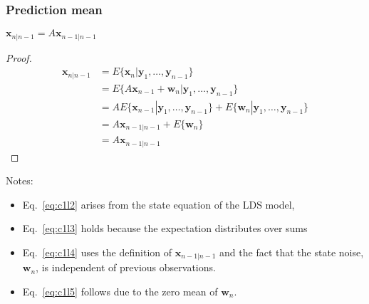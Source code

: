 \begin{frame}
    \frametitle{Prediction mean}

    \scriptsize
\begin{claim}
    $\mathbf{x}_{n|n-1}=A\mathbf{x}_{n-1|n-1}$
    \label{claim:predictionMean}
\end{claim}

\begin{proof}
    \begin{align}
        \mathbf{x}_{n|n-1}&=E\{\mathbf{x}_n|\mathbf{y}_1,\ldots,\mathbf{y}_{n-1}\}\nonumber\\
                          &=E\{A\mathbf{x}_{n-1}+\mathbf{w}_n|\mathbf{y}_1,\ldots,\mathbf{y}_{n-1}\}\label{eq:c1l2}\\
                          &=AE\{\mathbf{x}_{n-1}|\mathbf{y}_ 1,\ldots,\mathbf{y}_{n-1}\}+E\{\mathbf{w}_n|\mathbf{y}_1,\ldots,\mathbf{y}_{n-1}\}\label{eq:c1l3}\\
                          &=A\mathbf{x}_{n-1|n-1}+E\{\mathbf{w}_n\}\label{eq:c1l4}\\
                          &=A\mathbf{x}_{n-1|n-1\label{eq:c1l5}}
    \end{align}
\end{proof}

Notes:

\begin{itemize}

    \item Eq.~\ref{eq:c1l2} arises from the state equation of the LDS model,
    \item Eq.~\ref{eq:c1l3} holds because the expectation distributes over sums
    \item Eq.~\ref{eq:c1l4} uses the definition of $\mathbf{x}_{n-1|n-1}$ and
        the fact that the state noise, $\mathbf{w}_n$, is independent of previous observations.
    \item Eq.~\ref{eq:c1l5} follows due to the zero mean of $\mathbf{w}_n$.

\end{itemize}
    \normalsize

\end{frame}

